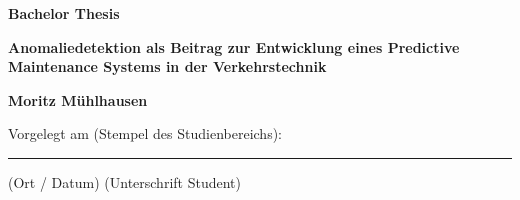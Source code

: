 %

%
\newcommand{\Bearbeiter}{Moritz Mühlhausen}
\newcommand{\Thema}{Anomaliedetektion als Beitrag zur Entwicklung eines Predictive Maintenance Systems in der Verkehrstechnik}
%
\thispagestyle{empty} 
%
\vspace{-20mm}
\begin{minipage}[t]{8cm}  
\end{minipage}
\hfill
{}
\vspace{15mm}
\begin{center}{\Huge\bf Bachelor Thesis} \par
\vspace{15mm}
{\LARGE\bf  \Thema} \par
\vspace{15mm}
{\LARGE\bf  \Bearbeiter} \par
\end{center}
% 
\vspace{15mm}
\begin{flushright}
    Vorgelegt am (Stempel des Studienbereichs): \\
    \vspace{20mm} %
    \rule[0ex]{\textwidth}{0.4pt} \hspace{5mm} (Ort / Datum) \hspace{30ex} (Unterschrift Student)
\end{flushright}
